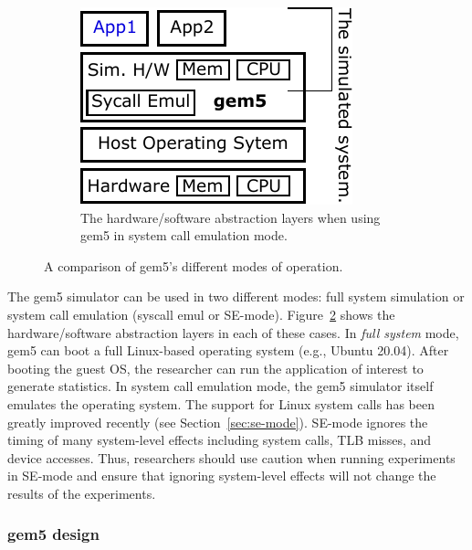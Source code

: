 \begin{figure}
  \hfill
  \begin{subfigure}{0.28\linewidth}
    \centering
    \includegraphics[width=\linewidth]{fig/gem5-fs-se}
    \caption{The hardware/software abstraction layers when using gem5 in system call emulation mode.}
    \label{fig:gem5-fs-se}
  \end{subfigure}
  \caption{A comparison of gem5's different modes of operation.}
  \label{fig:gem5-fs}
\end{figure}

The gem5 simulator can be used in two different modes: full system simulation or system call emulation (syscall emul or SE-mode).
Figure~\ref{fig:gem5-fs} shows the hardware/software abstraction layers in each of these cases.
In \emph{full system} mode, gem5 can boot a full Linux-based operating system (e.g., Ubuntu 20.04).
After booting the guest OS, the researcher can run the application of interest to generate statistics.
In system call emulation mode, the gem5 simulator itself emulates the operating system.
The support for Linux system calls has been greatly improved recently (see Section~\ref{sec:se-mode}).
SE-mode ignores the timing of many system-level effects including system calls, TLB misses, and device accesses.
Thus, researchers should use caution when running experiments in SE-mode and ensure that ignoring system-level effects will not change the results of the experiments.


\subsubsection{gem5 design}

